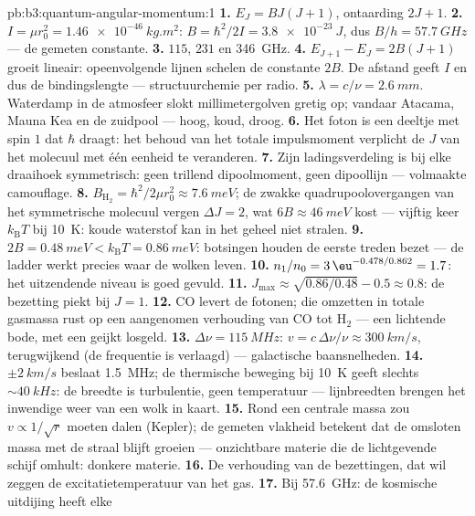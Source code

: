 \begin{solution}{pb:b3:quantum-angular-momentum:1}
\textbf{1.} $E_J = BJ(J+1)$, ontaarding $2J + 1$.
\textbf{2.} $I = \mu r_0^2 = \qty{1.46e-46}{kg.m^2}$: $B =
\hbar^2/2I = \qty{3.8e-23}{J}$, dus $B/h = \qty{57.7}{GHz}$ --- de
gemeten constante.
\textbf{3.} $115$, $231$ en \qty{346}{GHz}.
\textbf{4.} $E_{J+1} - E_J = 2B(J+1)$ groeit lineair: opeenvolgende
lijnen schelen de constante $2B$. De afstand geeft $I$ en dus de
bindingslengte --- structuurchemie per radio.
\textbf{5.} $\lambda = c/\nu = \qty{2.6}{mm}$. Waterdamp in de atmosfeer
slokt millimetergolven gretig op; vandaar Atacama, Mauna Kea en de
zuidpool --- hoog, koud, droog.
\textbf{6.} Het foton is een deeltje met spin $1$ dat $\hbar$ draagt: het
behoud van het totale impulsmoment verplicht de $J$ van het molecuul met
één eenheid te veranderen.
\textbf{7.} Zijn ladingsverdeling is bij elke draaihoek symmetrisch: geen
trillend dipoolmoment, geen dipoollijn --- volmaakte camouflage.
\textbf{8.} $B_{\text{H}_2} = \hbar^2/2\mu r_0^2 \approx
\qty{7.6}{meV}$; de zwakke quadrupoolovergangen van het symmetrische
molecuul vergen $\Delta J = 2$, wat $6B \approx
\qty{46}{meV}$ kost ---
vijftig keer $k_{\text{B}}T$ bij \qty{10}{K}: koude waterstof kan in het
geheel niet stralen.
\textbf{9.} $2B = \qty{0.48}{meV} < k_{\text{B}}T = \qty{0.86}{meV}$:
botsingen houden de eerste treden bezet --- de ladder werkt precies waar
de wolken leven.
\textbf{10.} $n_1/n_0 = 3\,\eu^{-0.478/0.862} = 1.7$: het uitzendende
niveau is goed gevuld.
\textbf{11.} $J_{\max} \approx \sqrt{0.86/0.48} - 0.5 \approx 0.8$: de
bezetting piekt bij $J = 1$.
\textbf{12.} CO levert de fotonen; die omzetten in totale gasmassa rust
op een aangenomen verhouding van CO tot H$_2$ --- een lichtende bode, met
een geijkt losgeld.
\textbf{13.} $\Delta\nu = \qty{115}{MHz}$: $v = c\,\Delta\nu/\nu
\approx \qty{300}{km/s}$, terugwijkend (de frequentie is verlaagd) ---
galactische baansnelheden.
\textbf{14.} $\pm\qty{2}{km/s}$ beslaat \qty{1.5}{MHz}; de thermische
beweging bij \qty{10}{K} geeft slechts $\sim\qty{40}{kHz}$: de breedte is
turbulentie, geen temperatuur --- lijnbreedten brengen het inwendige weer
van een wolk in kaart.
\textbf{15.} Rond een centrale massa zou $v \propto 1/\sqrt r$ moeten
dalen (Kepler); de gemeten vlakheid betekent dat de omsloten massa met de
straal blijft groeien --- onzichtbare materie die de lichtgevende schijf
omhult: donkere materie.
\textbf{16.} De verhouding van de bezettingen, dat wil zeggen de
excitatietemperatuur van het gas.
\textbf{17.} Bij \qty{57.6}{GHz}: de kosmische uitdijing heeft elke

\end{solution}
